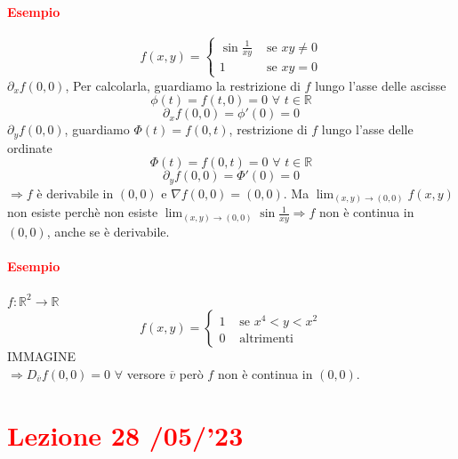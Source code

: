 \documentclass{article}
\newcommand{\R}{\mathbb{R}}
\begin{document}
\paragraph{\textcolor{red}{Esempio}}
\begin{equation*}
    f(x,y)=\begin{cases}
        \sin\frac{1}{xy}&\text{  se  }xy\neq0\\
        1& \text{  se  }xy=0
    \end{cases}
\end{equation*}
$\partial_{x}f(0,0)$, Per calcolarla, guardiamo la restrizione di $f$ lungo l'asse delle ascisse\\
\begin{equation*}
    \phi(t)=f(t,0)=0\,\,\forall\,\,t\in\R
\end{equation*}
\begin{equation*}
    \partial_xf(0,0)=\phi'(0)=0
\end{equation*}
$\partial_yf(0,0)$, guardiamo $\Phi(t)=f(0,t)$, restrizione di $f$ lungo l'asse delle ordinate
\begin{equation*}
    \Phi(t)=f(0,t)=0\,\,\forall\,\, t \in \R
\end{equation*}
\begin{equation*}
    \partial_yf(0,0)=\Phi'(0)=0
\end{equation*}
$\Rightarrow f$ è derivabile in $(0,0)$ e $\nabla f(0,0)=(0,0)$. Ma $\lim_{(x,y)\rightarrow(0,0)}f(x,y)$ non esiste perchè non esiste $\lim_{(x,y)\rightarrow(0,0)}\sin\frac{1}{xy}\Rightarrow f$ non è continua in $(0,0)$, anche se è derivabile.  

\paragraph{\textcolor{red}{Esempio}}
$f:\R^2\rightarrow\R$
\begin{equation*}
    f(x,y)=\begin{cases}
        1&\text{  se  }x^4<y<x^2\\
        0 &\text{  altrimenti}
    \end{cases}
\end{equation*}
IMMAGINE\\
$\Rightarrow D_{\overline{v}}f(0,0)=0\,\,\forall$ versore $\overline{v}$ però $f$ non è continua in $(0,0)$.

\newpage
\section{\textcolor{red}{Lezione 28 \space{}/05/'23}}
\end{document}
